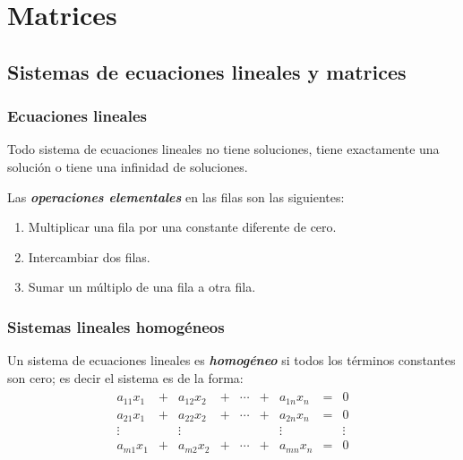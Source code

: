 \documentclass[a4paper,12pt]{article}
\begin{document}
\section{Matrices}


\subsection{Sistemas de ecuaciones lineales y matrices}

\subsubsection{Ecuaciones lineales}

\begin{concept}[i]
  Todo sistema de ecuaciones lineales no tiene soluciones, tiene exactamente
  una solución o tiene una infinidad de soluciones.
\end{concept}

Las \textbf{\emph{operaciones elementales}} en las filas son las siguientes:

\begin{concept}
  \begin{enumerate}
    \item Multiplicar una fila por una constante diferente de cero.
    \item Intercambiar dos filas.
    \item Sumar un múltiplo de una fila a otra fila.
  \end{enumerate}
\end{concept}

\subsubsection{Sistemas lineales homogéneos}
Un sistema de ecuaciones lineales es \textbf{\emph{homogéneo}} si todos los
términos constantes son cero; es decir el sistema es de la forma:
\begin{align*}
  \begin{matrix}
    a_{11}x_1 &+& a_{12}x_2 &+& \cdots &+& a_{1n}x_n &=& 0     \\
    a_{21}x_1 &+& a_{22}x_2 &+& \cdots &+& a_{2n}x_n &=& 0     \\
    \vdots    & &\vdots     & &        & &\vdots     & & \vdots\\
    a_{m1}x_1 &+& a_{m2}x_2 &+& \cdots &+& a_{mn}x_n &=& 0
  \end{matrix}
\end{align*}
\end{document}
